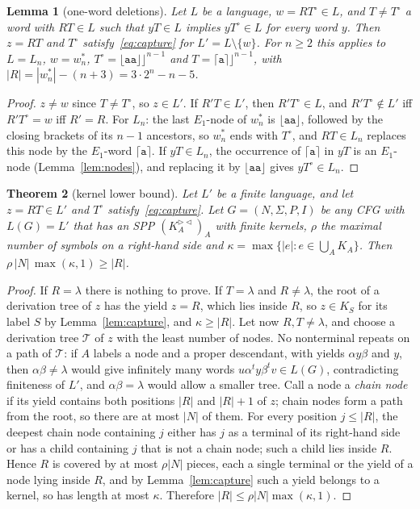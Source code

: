 \documentclass[11pt]{article}
\numberwithin{equation}{section}
\theoremstyle{plain}
\newtheorem{theorem}{Theorem}[section]
\newtheorem{lemma}[theorem]{Lemma}
\theoremstyle{definition}
\theoremstyle{remark}
\theoremstyle{plain}
\newcommand{\eps}{\lambda}
\newcommand{\RL}{^{\rhd\lhd}}
\newcommand{\Lfl}{\lfloor}
\newcommand{\Rfl}{\rfloor}
\newcommand{\Lce}{\lceil}
\newcommand{\Rce}{\rceil}
\newcommand{\ta}{\mathtt a}
\begin{document}
\begin{lemma}[one-word deletions]\label{lem:one-word}
Let $L$ be a language, $w=RT^\circ\in L$, and $T\ne T^\circ$ a word with
$RT\in L$ such that $yT\in L$ implies $yT^\circ\in L$ for every word $y$.
Then $z=RT$ and $T^\circ$ satisfy~\eqref{eq:capture} for $L'=L\setminus\{w\}$.
For $n\ge2$ this applies to $L=L_n$, $w=w^*_n$,
$T^\circ=\Lfl\ta\ta\Rfl\Rfl^{n-1}$ and $T=\Lce\ta\Rce\Rfl^{n-1}$, with
$|R|=|w^*_n|-(n+3)=3\cdot2^n-n-5$.
\end{lemma}
\begin{proof}
$z\ne w$ since $T\ne T^\circ$, so $z\in L'$.  If $R'T\in L'$, then
$R'T^\circ\in L$, and $R'T^\circ\notin L'$ iff $R'T^\circ=w$ iff $R'=R$.  For
$L_n$: the last $E_1$-node of $w^*_n$ is $\Lfl\ta\ta\Rfl$, followed by the
closing brackets of its $n-1$ ancestors, so $w^*_n$ ends with $T^\circ$, and
$RT\in L_n$ replaces this node by the $E_1$-word $\Lce\ta\Rce$.  If
$yT\in L_n$, the occurrence of $\Lce\ta\Rce$ in $yT$ is an $E_1$-node
(Lemma~\ref{lem:nodes}), and replacing it by $\Lfl\ta\ta\Rfl$ gives
$yT^\circ\in L_n$.
\end{proof}

\begin{theorem}[kernel lower bound]\label{thm:general-lower}
Let $L'$ be a finite language, and let $z=RT\in L'$ and $T^\circ$
satisfy~\eqref{eq:capture}.  Let $G=(N,\Sigma,P,I)$ be any CFG with $L(G)=L'$
that has an SPP $(K_A\RL)_A$ with finite kernels, $\rho$ the maximal number
of symbols on a right-hand side and $\kappa=\max\{|e|:e\in\bigcup_AK_A\}$.
Then $\rho\,|N|\,\max(\kappa,1)\ge|R|$.
\end{theorem}
\begin{proof}
If $R=\eps$ there is nothing to prove.  If $T=\eps$ and $R\ne\eps$, the root of
a derivation tree of $z$ has the yield $z=R$, which lies inside $R$, so
$z\in K_S$ for its label $S$ by Lemma~\ref{lem:capture}, and $\kappa\ge|R|$.
Let now $R,T\ne\eps$, and choose a derivation tree $\mathcal T$ of $z$ with the
least number of nodes.
No nonterminal repeats on a path of $\mathcal T$: if $A$ labels a node and a proper
descendant, with yields $\alpha y\beta$ and $y$, then $\alpha\beta\ne\eps$
would give infinitely many words $u\alpha^ty\beta^tv\in L(G)$, contradicting
finiteness of $L'$, and $\alpha\beta=\eps$ would allow a smaller tree.  Call a
node a \emph{chain node} if its yield contains both positions $|R|$ and
$|R|+1$ of $z$; chain nodes form a path from the root, so there are at most
$|N|$ of them.  For every position $j\le|R|$, the deepest chain node
containing $j$ either has $j$ as a terminal of its right-hand side or has a
child containing $j$ that is not a chain node; such a child lies inside
$R$.  Hence $R$ is covered by at most $\rho|N|$ pieces, each a single terminal
or the yield of a node lying inside $R$, and by Lemma~\ref{lem:capture} such
a yield belongs to a kernel, so has length at most $\kappa$.  Therefore
$|R|\le\rho|N|\max(\kappa,1)$.
\end{proof}
\end{document}
